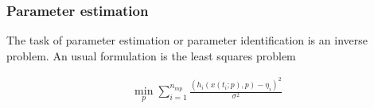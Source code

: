 \documentclass{scrartcl}[12pt, halfparskip]
\numberwithin{equation}{section}
\numberwithin{figure}{section}
\numberwithin{table}{section}
\begin{document}


\subsubsection{Parameter estimation}
\label{sec:parameter_estimation_theory}

The task of parameter estimation or parameter identification is an inverse problem. An usual formulation is the least squares problem

\begin{align}
	\min_p \sum_{i=1}^{n_{mp}}  \frac{(h_i(x(t_i;p),p) - \eta_i)^2}{\sigma^2}
\end{align}
\end{document}

